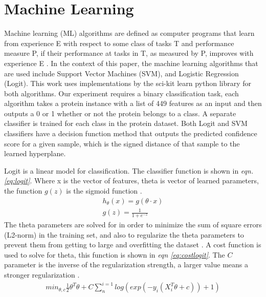 \documentclass[ms]{nuthesis}
\begin{document}
\section{Machine Learning}
\par Machine learning (ML) algorithms are defined as computer programs that learn from experience E
with respect to some class of tasks T and performance measure P, if their performance at
tasks in T, as measured by P, improves with experience E \cite{mitchell}. In the context of this paper,
the machine learning algorithms that are used include Support Vector Machines (SVM), and Logistic Regression (Logit).
 This work uses implementations by the sci-kit learn python library \cite{sklearn-api} for both algorithms. Our
 experiment requires a binary classification task, each algorithm takes a protein instance with a list of 449 features
 as an input and then outputs a 0 or 1 whether or not the protein belongs to a class. A separate classifier is trained
 for each class in the protein dataset. Both Logit and SVM classifiers have a decision function method that outputs
 the predicted confidence score for a given sample, which is the signed distance of that sample to the learned
 hyperplane.
 \par Logit is a linear model for classification. The classifier function is shown in \textit{eqn. \ref{eq:logit}}.
 Where x is the vector of features, theta is vector of learned parameters, the function $g(z)$ is the sigmoid
 function \cite{Coursera}.
\FloatBarrier
\begin{equation}
\label{eq:logit}
\begin{aligned}
h_{\theta}(x) = g(\theta \cdot x) \\
g(z) = \frac{1}{1+e^{-z}}
\end{aligned}
\end{equation}
\FloatBarrier
The theta parameters are solved for in order to minimize the sum of square errors (L2-norm)
in the training set, and also to regularize the theta parameters to prevent them from getting to large
and overfitting the dataset \cite{scikit-learn}. A cost function is used to solve for theta, this
function is shown in \textit{eqn \ref{eq:costlogit}}. The $C$ parameter is the inverse of the regularization
strength, a larger value means a stronger regularization \cite{scikit-learn}.
\FloatBarrier
\begin{equation}
\label{eq:costlogit}
\begin{aligned}
min_{\theta,c}\frac{1}{2}\theta^{T}\theta + C\sum_{n}^{i=1}log(exp(-y_i(X_{i}^{T}\theta+c))+1)
\end{aligned}
\end{equation}
\end{document}
